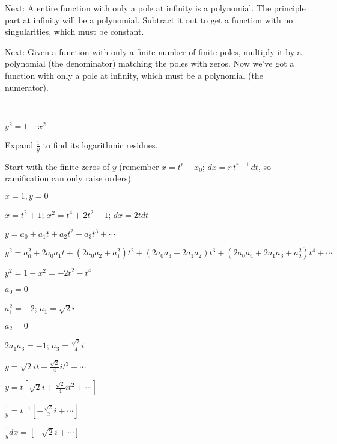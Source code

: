 Next: A entire function with only a pole at infinity is a polynomial.
The principle part at infinity will be a polynomial.  Subtract it out
to get a function with no singularities, which must be constant.

Next: Given a function with only a finite number of finite poles,
multiply it by a polynomial (the denominator) matching the poles with
zeros.  Now we've got a function with only a pole at infinity, which
must be a polynomial (the numerator).

======

$y^2 = 1 - x^2$

Expand $\frac{1}{y}$ to find its logarithmic residues.

Start with the finite zeros of $y$ (remember $x=t^r+x_0$; $dx=r\,
t^{r-1}\, dt$, so ramification can only raise orders)

$x=1, y=0$

$x=t^2+1$; $x^2=t^4+2t^2+1$; $dx = 2 t dt$

$y=a_0 + a_1 t + a_2 t^2 + a_3 t^3 + \cdots$

$y^2 = a_0^2 + 2 a_0 a_1 t + (2 a_0 a_2 + a_1^2) t^2 + (2 a_0 a_3 + 2 a_1 a_2) t^3 + (2 a_0 a_4 + 2 a_1 a_3 + a_2^2) t^4 + \cdots$

$y^2 = 1 - x^2 = -2t^2 - t^4$

$a_0=0$

$a_1^2 = -2$; $a_1 = \sqrt{2}i$

$a_2 = 0$

$2 a_1 a_3 = -1$; $a_3 = \frac{\sqrt{2}}{4} i$

$y = \sqrt{2}it + \frac{\sqrt{2}}{4} it^3 + \cdots$

$y = t \left[ \sqrt{2}i + \frac{\sqrt{2}}{4} it^2 + \cdots \right]$

$\frac{1}{y} = t^{-1} \left[ -\frac{\sqrt{2}}{2}i + \cdots \right]$

$\frac{1}{y} dx = \left[ -\sqrt{2}i + \cdots \right] $
